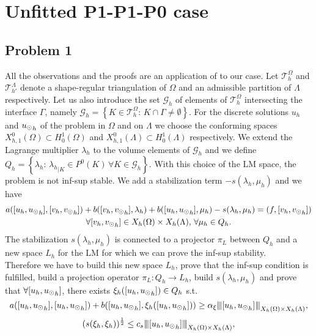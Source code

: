 \section{Unfitted P1-P1-P0 case}
\subsection{Problem 1} All the observations and the proofs are an application of \cite{burman2014} to our case. Let $\mathcal{T}^{\Omega}_h$ and  $\mathcal{T}^{\Lambda}_{h'}$ denote a shape-regular triangulation  of $\Omega$ and an admissible partition  of $\Lambda$ respectively. Let us also introduce the set $\mathcal{G}_h$ of elements of $\mathcal{T}^{\Omega}_h$ intersecting the interface $\Gamma$, namely $\mathcal{G}_h=\left\{ K\in \mathcal{T}^{\Omega}_h : \, K\cap \Gamma \neq \emptyset \right\}$. For the discrete solutions $u_h$ and ${u_{\odot}}_h$ of the problem in $\Omega$ and on $\Lambda$ we choose the conforming spaces $X_{h,1}^0(\Omega)\subset H^1_0(\Omega)$ and  $X_{h,1}^0(\Lambda)\subset H^1_0(\Lambda)$ respectively. We extend the Lagrange multiplier $\lambda_h$ to the volume elements of $\mathcal{G}_h$ and we define $Q_h=\left\{\lambda_h: \, {\lambda_h}_{|K}\in P^0(K)\,  \forall K\in \mathcal{G}_h\right\}$. With this choice of the LM space, the problem is not inf-sup stable. We add a stabilization term $-s(\lambda_h, \mu_h)$ and we have
\begin{multline*}
a([u_h, {u_{\odot}}_h], [v_h, {v_{\odot}}_h]) + b([v_h, {v_{\odot}}_h], \lambda_h) + b([u_h, {u_{\odot}}_h], \mu_h) - s(\lambda_h, \mu_h)= (f, [v_h, {v_{\odot}}_h])\\
 \forall [v_h, {v_{\odot}}_h]\in X_h(\Omega)\times X_h(\Lambda) ,\, \forall \mu_h \in Q_h.
\end{multline*}
The stabilization $s(\lambda_h, \mu_h)$ is connected to a projector $\pi_L$ between $Q_h$ and a new space $L_h$ for the LM for which we can prove the inf-sup stability.\\
Therefore we have to build this new space $L_h$, prove that the inf-sup condition is fulfilled, build a projection operator $\pi_L: Q_h \rightarrow L_h$, build $s(\lambda_h, \mu_h)$ and prove that $\forall [u_h, {u_{\odot}}_h]$, there exists $\xi_h([u_h, {u_{\odot}}_h]) \in Q_h$ s.t.  
\begin{equation}\label{stab_coercivity}
a([u_h, {\ud}_h],[u_h, {\ud}_h] ) + b([u_h, {\ud}_h], \xi_h([u_h, {\ud}_h])) \geq \alpha_\xi \vertiii{[u_h, {\ud}_h]}_{X_h(\Omega)\times X_h(\Lambda) },
\end{equation}
\begin{equation}\label{stab_stability}
(s(\xi_{h}, \xi_{h}))^{\frac 12} \leq c_s \vertiii{[u_h, {\ud}_h]}_{X_h(\Omega)\times X_h(\Lambda) },
\end{equation}
